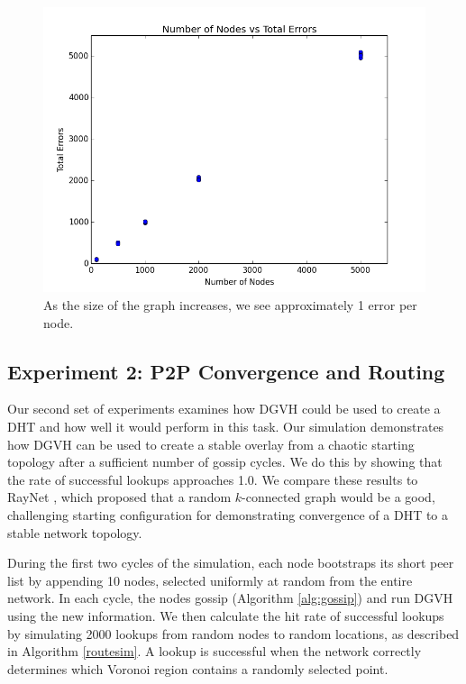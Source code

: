 \begin{figure}
	\centering
	\includegraphics[width=1.1\linewidth]{error_rate}
	\caption{As the size of the graph increases, we see approximately 1 error per node.}
	\label{exp_0}
\end{figure}







\subsection{Experiment 2: P2P Convergence and Routing}
Our second set of experiments examines how DGVH could be used to create a DHT and how well it would perform in this task.
Our simulation demonstrates how DGVH  can be used to create a stable overlay from a chaotic starting topology after a sufficient number of gossip cycles.  
We do this by showing that the rate of successful lookups approaches 1.0.
We compare these results to RayNet \cite{raynet}, which proposed that a random $k$-connected graph would be a good, challenging starting configuration for demonstrating convergence of a DHT to a stable network topology.

During the first two cycles of the simulation, each node bootstraps its short peer list by appending 10 nodes, selected uniformly at random from the entire network.
In each cycle, the nodes gossip (Algorithm \ref{alg:gossip}) and run DGVH using the new information.
We then calculate the hit rate of successful lookups by simulating 2000 lookups from random nodes to random locations, as described in Algorithm \ref{routesim}.
A lookup is successful when the network correctly determines which Voronoi region contains a randomly selected point.


